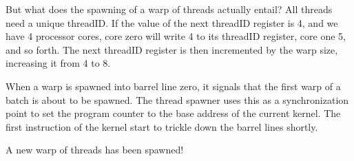 But what does the spawning of a warp of threads actually entail?
All threads need a unique threadID.
If the value of the next threadID register is 4, and we have 4 processor cores,
core zero will write 4 to its threadID register, core one 5, and so forth.
The next threadID register is then incremented by the warp size, increasing it from 4 to 8.

When a warp is spawned into barrel line zero, it signals that the first warp of a batch is about to be spawned.
The thread spawner uses this as a synchronization point to set the program counter to the base address of the current kernel.
The first instruction of the kernel start to trickle down the barrel lines shortly.

A new warp of threads has been spawned!
